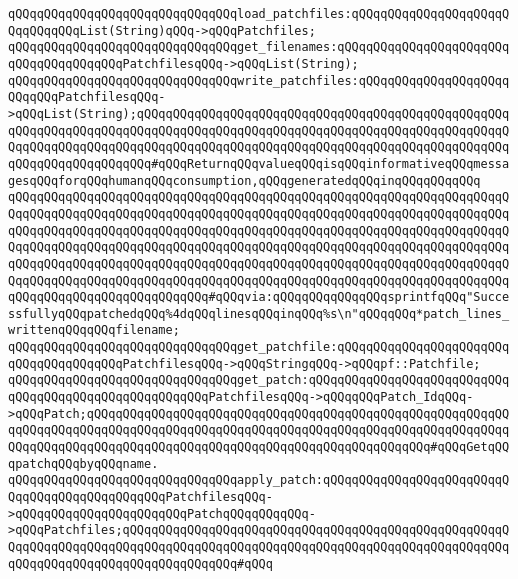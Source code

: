 \verb|qQQqqQQqqQQqqQQqqQQqqQQqqQQqqQQqload_patchfiles:qQQqqQQqqQQqqQQqqQQqqQQqqQQqqQQqList(String)qQQq->qQQqPatchfiles;|\newline
\newline
\verb|qQQqqQQqqQQqqQQqqQQqqQQqqQQqqQQqget_filenames:qQQqqQQqqQQqqQQqqQQqqQQqqQQqqQQqqQQqqQQqPatchfilesqQQq->qQQqList(String);|\newline
\newline
\verb|qQQqqQQqqQQqqQQqqQQqqQQqqQQqqQQqwrite_patchfiles:qQQqqQQqqQQqqQQqqQQqqQQqqQQqPatchfilesqQQq->qQQqList(String);qQQqqQQqqQQqqQQqqQQqqQQqqQQqqQQqqQQqqQQqqQQqqQQqqQQqqQQqqQQqqQQqqQQqqQQqqQQqqQQqqQQqqQQqqQQqqQQqqQQqqQQqqQQqqQQqqQQqqQQqqQQqqQQqqQQqqQQqqQQqqQQqqQQqqQQqqQQqqQQqqQQqqQQqqQQqqQQqqQQqqQQqqQQqqQQqqQQqqQQqqQQqqQQqqQQq#qQQqReturnqQQqvalueqQQqisqQQqinformativeqQQqmessagesqQQqforqQQqhumanqQQqconsumption,qQQqgeneratedqQQqinqQQqqQQqqQQq|\newline
\verb|qQQqqQQqqQQqqQQqqQQqqQQqqQQqqQQqqQQqqQQqqQQqqQQqqQQqqQQqqQQqqQQqqQQqqQQqqQQqqQQqqQQqqQQqqQQqqQQqqQQqqQQqqQQqqQQqqQQqqQQqqQQqqQQqqQQqqQQqqQQqqQQqqQQqqQQqqQQqqQQqqQQqqQQqqQQqqQQqqQQqqQQqqQQqqQQqqQQqqQQqqQQqqQQqqQQqqQQqqQQqqQQqqQQqqQQqqQQqqQQqqQQqqQQqqQQqqQQqqQQqqQQqqQQqqQQqqQQqqQQqqQQqqQQqqQQqqQQqqQQqqQQqqQQqqQQqqQQqqQQqqQQqqQQqqQQqqQQqqQQqqQQqqQQqqQQqqQQqqQQqqQQqqQQqqQQqqQQqqQQqqQQqqQQqqQQqqQQqqQQqqQQqqQQqqQQqqQQqqQQqqQQqqQQqqQQqqQQqqQQqqQQqqQQq#qQQqvia:qQQqqQQqqQQqqQQqsprintfqQQq"SuccessfullyqQQqpatchedqQQq%4dqQQqlinesqQQqinqQQq%s\n"qQQqqQQq*patch_lines_writtenqQQqqQQqfilename;|\newline
\verb|qQQqqQQqqQQqqQQqqQQqqQQqqQQqqQQqget_patchfile:qQQqqQQqqQQqqQQqqQQqqQQqqQQqqQQqqQQqqQQqPatchfilesqQQq->qQQqStringqQQq->qQQqpf::Patchfile;|\newline
\newline
\verb|qQQqqQQqqQQqqQQqqQQqqQQqqQQqqQQqget_patch:qQQqqQQqqQQqqQQqqQQqqQQqqQQqqQQqqQQqqQQqqQQqqQQqqQQqqQQqPatchfilesqQQq->qQQqqQQqPatch_IdqQQq->qQQqPatch;qQQqqQQqqQQqqQQqqQQqqQQqqQQqqQQqqQQqqQQqqQQqqQQqqQQqqQQqqQQqqQQqqQQqqQQqqQQqqQQqqQQqqQQqqQQqqQQqqQQqqQQqqQQqqQQqqQQqqQQqqQQqqQQqqQQqqQQqqQQqqQQqqQQqqQQqqQQqqQQqqQQqqQQqqQQqqQQqqQQqqQQqqQQq#qQQqGetqQQqpatchqQQqbyqQQqname.|\newline
\newline
\verb|qQQqqQQqqQQqqQQqqQQqqQQqqQQqqQQqapply_patch:qQQqqQQqqQQqqQQqqQQqqQQqqQQqqQQqqQQqqQQqqQQqqQQqPatchfilesqQQq->qQQqqQQqqQQqqQQqqQQqqQQqPatchqQQqqQQqqQQq->qQQqPatchfiles;qQQqqQQqqQQqqQQqqQQqqQQqqQQqqQQqqQQqqQQqqQQqqQQqqQQqqQQqqQQqqQQqqQQqqQQqqQQqqQQqqQQqqQQqqQQqqQQqqQQqqQQqqQQqqQQqqQQqqQQqqQQqqQQqqQQqqQQqqQQqqQQqqQQqqQQqqQQq#qQQq|\newline
